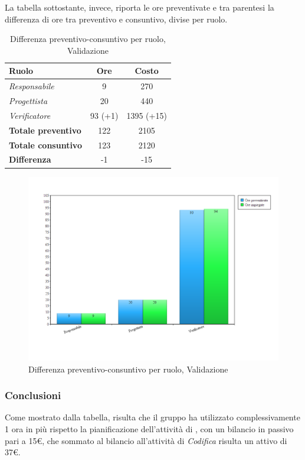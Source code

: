 \newpage
La tabella sottostante, invece, riporta le ore preventivate e  tra parentesi la differenza di ore tra preventivo e consuntivo, divise per ruolo.

\begin{table}[H]
	\begin{center}
		\begin{tabular}{|l|c|c|}
			\hline
			\textbf{Ruolo}	& \textbf{Ore} & \textbf{Costo} 		\\
			\hline
			\textit{Responsabile}		&	9		&	270			\\
			\hline
			\textit{Progettista}		&	20		&	440			\\
			\hline
			\textit{Verificatore}		&	93 (+1)	&	1395 (+15)	\\
			\hline
			\textbf{Totale preventivo}	&	122		& 	2105		\\
			\hline
			\textbf{Totale consuntivo}	&	123		&  	2120		\\
			\hline
			\textbf{Differenza} 		&	-1		&	-15			\\
			\hline
		\end{tabular}
	\end{center}
	\caption{Differenza preventivo-consuntivo per ruolo, Validazione}
\end{table}

\begin{figure}[H]
	\centering
	\includegraphics[scale=0.4]{immagini/Grafi/Validazione_oreRuolo.png}
	\caption{Differenza preventivo-consuntivo per ruolo, Validazione}
\end{figure}
\FloatBarrier

\subsubsection{Conclusioni}
Come mostrato dalla tabella, risulta che il gruppo ha utilizzato complessivamente 1 ora in più rispetto la pianificazione dell'attività di \textit{\VV}, con un bilancio in passivo pari a 15€, che sommato al bilancio all'attività di \textit{Codifica} risulta un attivo di 37€.

